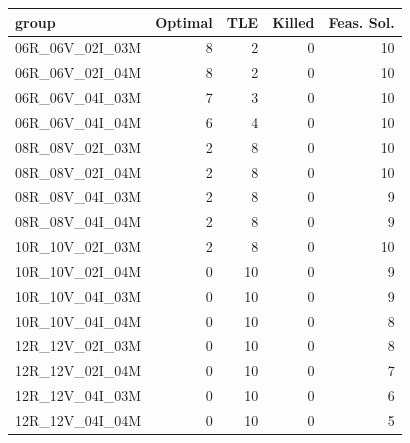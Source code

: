 
\begin{tabular}{lrrrr}
\toprule
group & Optimal & TLE & Killed & Feas. Sol.\\
\midrule
06R\_06V\_02I\_03M & 8 & 2 & 0 & 10\\
06R\_06V\_02I\_04M & 8 & 2 & 0 & 10\\
06R\_06V\_04I\_03M & 7 & 3 & 0 & 10\\
06R\_06V\_04I\_04M & 6 & 4 & 0 & 10\\
08R\_08V\_02I\_03M & 2 & 8 & 0 & 10\\
\addlinespace
08R\_08V\_02I\_04M & 2 & 8 & 0 & 10\\
08R\_08V\_04I\_03M & 2 & 8 & 0 & 9\\
08R\_08V\_04I\_04M & 2 & 8 & 0 & 9\\
10R\_10V\_02I\_03M & 2 & 8 & 0 & 10\\
10R\_10V\_02I\_04M & 0 & 10 & 0 & 9\\
\addlinespace
10R\_10V\_04I\_03M & 0 & 10 & 0 & 9\\
10R\_10V\_04I\_04M & 0 & 10 & 0 & 8\\
12R\_12V\_02I\_03M & 0 & 10 & 0 & 8\\
12R\_12V\_02I\_04M & 0 & 10 & 0 & 7\\
12R\_12V\_04I\_03M & 0 & 10 & 0 & 6\\
\addlinespace
12R\_12V\_04I\_04M & 0 & 10 & 0 & 5\\
\bottomrule
\end{tabular}
